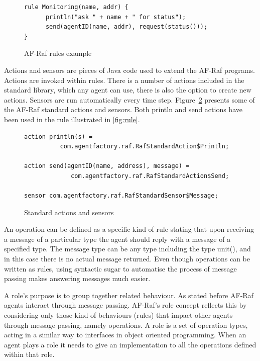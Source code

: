\documentclass[a4paper,12pt,oneside,fleqn]{book} %
\begin{document}

\begin{figure}\footnotesize %
\begin{verbatim}
rule Monitoring(name, addr) {
      println("ask " + name + " for status");
      send(agentID(name, addr), request(status()));
}
\end{verbatim}
\caption{AF-Raf rules example}
\label{fig:rule}
\end{figure} %

Actions and sensors are pieces of Java code used to extend the AF-Raf
programs. Actions are invoked within rules. There is a number of actions
included in the standard library, which any agent can use, there is also
the option to create new actions. Sensors are run automatically every time
step. Figure~\ref{fig:actions-sensors} presents some of the AF-Raf standard
actions and sensors. Both {\sf println} and {\sf send} actions have been
used in the rule illustrated in \autoref{fig:rule}.


\begin{figure}\footnotesize %
\begin{verbatim}
action println(s) =
          com.agentfactory.raf.RafStandardAction$Println;

action send(agentID(name, address), message) =
             com.agentfactory.raf.RafStandardAction$Send;

sensor com.agentfactory.raf.RafStandardSensor$Message;
\end{verbatim}
\caption{Standard actions and sensors}
\label{fig:actions-sensors}
\end{figure} %


An operation can be defined as a specific kind of rule stating that upon
receiving a message of a particular type the agent should reply with a
message of a specified type. The message type can be any type including the
type unit(), and in this case there is no actual message returned. Even
though operations can be written as rules, using syntactic sugar to
automatise the process of message passing makes answering messages much
easier.

A role's purpose is to group together related behaviour. As stated before
AF-Raf agents interact through message passing. AF-Raf's role concept
reflects this by considering only those kind of behaviours (rules) that
impact other agents through message passing, namely operations. A role is a
set of operation types, acting in a similar way to interfaces in object
oriented programming. When an agent plays a role it needs to give an
implementation to all the operations defined within that role.
\end{document}
